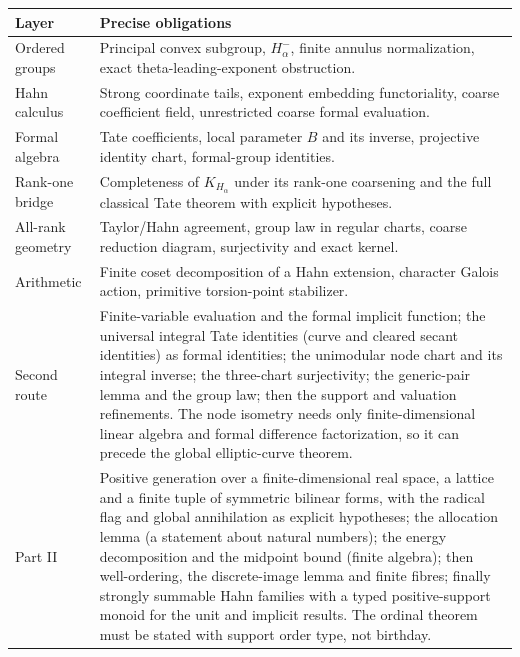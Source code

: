 \documentclass[11pt,letterpaper]{article}
\theoremstyle{definition}
\begin{document}
\begin{center}
\begin{tabular}{p{}p{}}
\toprule
Layer & Precise obligations \\
\midrule
Ordered groups & Principal convex subgroup, $H_\alpha^-$, finite annulus
normalization, exact theta-leading-exponent obstruction.\\[4pt]
Hahn calculus & Strong coordinate tails, exponent embedding functoriality,
coarse coefficient field, unrestricted coarse formal evaluation.\\[4pt]
Formal algebra & Tate coefficients, local parameter $B$ and its inverse,
projective identity chart, formal-group identities.\\[4pt]
Rank-one bridge & Completeness of $K_{H_\alpha}$ under its rank-one
coarsening and the full classical Tate theorem with explicit hypotheses.\\[4pt]
All-rank geometry & Taylor/Hahn agreement, group law in regular charts,
coarse reduction diagram, surjectivity and exact kernel.\\[4pt]
Arithmetic & Finite coset decomposition of a Hahn extension, character
Galois action, primitive torsion-point stabilizer.\\[4pt]
Second route & Finite-variable evaluation and the formal implicit
function; the universal integral Tate identities (curve and cleared secant
identities) as formal identities; the unimodular node chart and its
integral inverse; the three-chart surjectivity; the generic-pair lemma and
the group law; then the support and valuation refinements. The node
isometry needs only finite-dimensional linear algebra and formal difference
factorization, so it can precede the global elliptic-curve theorem.\\[4pt]
Part II & Positive generation over a finite-dimensional real space, a
lattice and a finite tuple of symmetric bilinear forms, with the radical
flag and global annihilation as explicit hypotheses; the allocation lemma
(a statement about natural numbers); the energy decomposition and the
midpoint bound (finite algebra); then well-ordering, the discrete-image
lemma and finite fibres; finally strongly summable Hahn families with a
typed positive-support monoid for the unit and implicit results. The
ordinal theorem must be stated with support order type, not birthday.\\
\bottomrule
\end{tabular}
\end{center}
\end{document}
